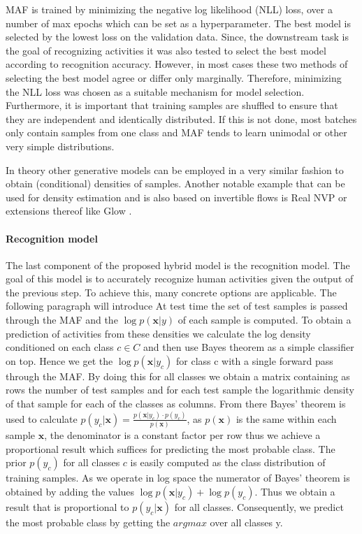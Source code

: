 \documentclass[11pt,titlepage,oneside,openany]{book}
\begin{document}
MAF is trained by minimizing the negative log likelihood (NLL) loss, over a number of max epochs which can be set as a hyperparameter. The best model is selected by the lowest loss on the validation data. Since, the downstream task is the goal of recognizing activities it was also tested to select the best model according to recognition accuracy. However, in most cases these two methods of selecting the best model agree or differ only marginally. Therefore, minimizing the NLL loss was chosen as a suitable mechanism for model selection. Furthermore, it is important that training samples are shuffled to ensure that they are independent and identically distributed. If this is not done, most batches only contain samples from one class and MAF tends to learn unimodal or other very simple distributions.

In theory other generative models can be employed in a very similar fashion to obtain (conditional) densities of samples. Another notable example that can be used for density estimation and is also based on invertible flows is Real NVP \cite{dinh_density_2017} or extensions thereof like Glow \cite{kingma_glow_2018}.

\paragraph{Recognition model}
The last component of the proposed hybrid model is the recognition model. The goal of this model is to accurately recognize human activities given the output of the previous step. To achieve this, many concrete options are applicable. The following paragraph will introduce
At test time the set of test samples is passed through the MAF and the $\log p(\pmb{x}|y)$ of each sample is computed. To obtain a prediction of activities from these densities we calculate the log density conditioned on each class $c \in C$ and then use Bayes theorem as a simple classifier on top. Hence we get the $\log p(\pmb{x}|y_c)$ for class c with a single forward pass through the MAF. By doing this for all classes we obtain a matrix containing as rows the number of test samples and for each test sample the logarithmic density of that sample for each of the classes as columns. From there Bayes' theorem is used to calculate $p(y_c|\pmb{x}) = \frac{p(\pmb{x}|y_c) \cdot p(y_c)}{p(\pmb{x})}$, as $p(\pmb{x})$ is the same within each sample $\pmb{x}$, the denominator is a constant factor per row thus we achieve a proportional result which suffices for predicting the most probable class. The prior $p(y_c)$ for all classes $c$ is easily computed as the class distribution of training samples. As we operate in log space the numerator of Bayes' theorem is obtained by adding the values $\log p(\pmb{x}|y_c) + \log p(y_c)$. Thus we obtain a result that is proportional to $p(y_c|\pmb{x})$ for all classes. Consequently, we predict the most probable class by getting the $argmax$ over all classes y.
\end{document}
